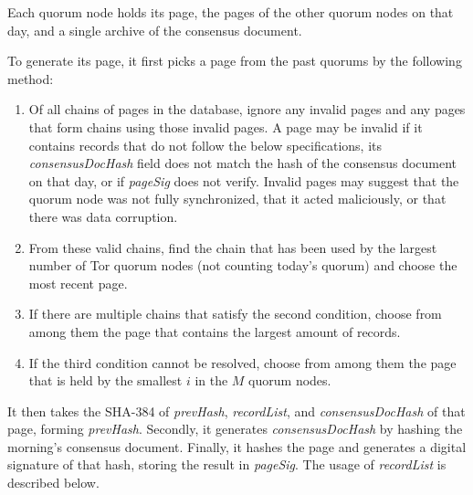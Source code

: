 Each quorum node holds its page, the pages of the other quorum nodes on that day, and a single archive of the consensus document. 

To generate its page, it first picks a page from the past quorums by the following method:


\begin{enumerate}
	\item Of all chains of pages in the database, ignore any invalid pages and any pages that form chains using those invalid pages. A page may be invalid if it contains records that do not follow the below specifications, its \emph{consensusDocHash} field does not match the hash of the consensus document on that day, or if \emph{pageSig} does not verify. Invalid pages may suggest that the quorum node was not fully synchronized, that it acted maliciously, or that there was data corruption.
	\item From these valid chains, find the chain that has been used by the largest number of Tor quorum nodes (not counting today's quorum) and choose the most recent page.
	\item If there are multiple chains that satisfy the second condition, choose from among them the page that contains the largest amount of records.
	\item If the third condition cannot be resolved, choose from among them the page that is held by the smallest $ i $ in the $ M $ quorum nodes.
\end{enumerate}

It then takes the SHA-384 of \emph{prevHash}, \emph{recordList}, and \emph{consensusDocHash} of that page, forming \emph{prevHash}. Secondly, it generates \emph{consensusDocHash} by hashing the morning's consensus document. Finally, it hashes the page and generates a digital signature of that hash, storing the result in \emph{pageSig}. The usage of \emph{recordList} is described below.


